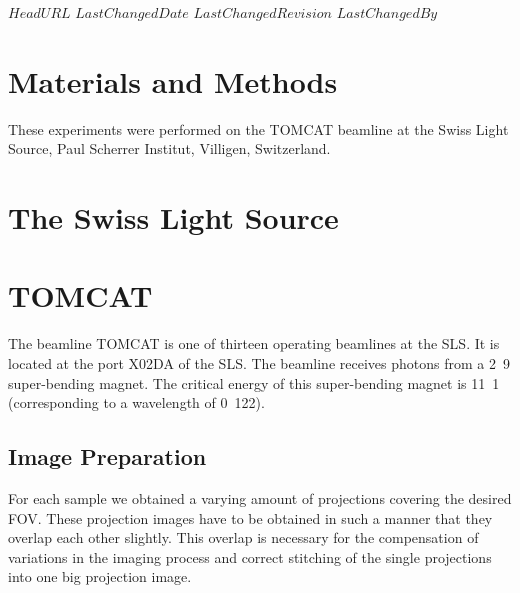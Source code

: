\svnidlong
{$HeadURL$}
{$LastChangedDate$}
{$LastChangedRevision$}
{$LastChangedBy$}
\section{Materials and Methods}

These experiments were performed on the TOMCAT beamline at the Swiss Light Source, Paul Scherrer Institut, Villigen, Switzerland.

\section{The Swiss Light Source}

\section{TOMCAT}
\label{sec:tomcat}
The beamline TOMCAT is one of thirteen operating beamlines at the SLS. It is located at the port X02DA of the SLS. The beamline receives photons from a \unit{2.9}{\tesla} super-bending magnet. The critical energy of this super-bending magnet is \unit{11.1}{\kilo\electronvolt} (corresponding to a wavelength of \unit{0.122}{\nano\meter}).


\subsection{Image Preparation}
For each sample we obtained a varying amount of projections covering the desired FOV. These projection images have to be obtained in such a manner that they overlap each other slightly. This overlap is necessary for the compensation of variations in the imaging process and correct stitching of the single projections into one big projection image. 

